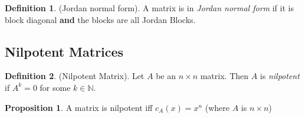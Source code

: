 \documentclass{article}
\theoremstyle{definition} \newtheorem*{definition}{Definition}
\newtheorem{proposition}[theorem]{Proposition}
\newcommand{\naturals}{\mathbb{N}} \newcommand{\complexes}{\mathbb{C}}
\begin{document}
    \begin{definition}
      (Jordan normal form). A matrix is in \textit{Jordan normal form}
      if it is block diagonal \textbf{and} the blocks are all Jordan
      Blocks.
    \end{definition}

    \subsection{Nilpotent Matrices}
    \begin{definition}
      (Nilpotent Matrix). Let $A$ be an $n \times n$ matrix. Then $A$ is
      \textit{nilpotent} if $A^k = 0$ for some $k \in \naturals$.\\
    \end{definition}

    \begin{proposition}
      A matrix is nilpotent iff $c_A(x)=x^n$ (where $A$ is $n \times n$)

   
    \end{proposition}
\end{document}
